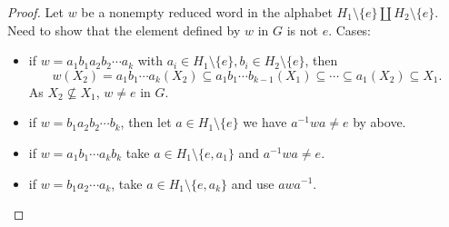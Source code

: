 \documentclass[a4paper]{article}
\begin{document}
\begin{proof}
  Let \(w\) be a nonempty reduced word in the alphabet \(H_1\setminus\{e\} \amalg H_2 \setminus \{e\}\). Need to show that the element defined by \(w\) in \(G\) is not \(e\). Cases:
  \begin{itemize}
  \item if \(w = a_1b_1 a_2b_2 \cdots a_k\) with \(a_i \in H_1 \setminus \{e\}, b_i \in H_2 \setminus \{e\}\), then
    \[
      w(X_2) = a_1b_1 \cdots a_k(X_2) \subseteq a_1b_1 \cdots b_{k - 1}(X_1)
      \subseteq \cdots \subseteq a_1(X_2) \subseteq X_1.
    \]
    As \(X_2 \nsubseteq X_1\), \(w \ne e\) in \(G\).
  \item if \(w = b_1a_2b_2 \cdots b_k\), then let \(a \in H_1 \setminus \{e\}\) we have \(a^{-1}wa \ne e\) by above.
  \item if \(w = a_1b_1 \cdots a_kb_k\) take \(a \in H_1 \setminus \{e, a_1\}\) and \(a^{-1}wa \ne e\).
  \item if \(w = b_1a_2 \cdots a_k\), take \(a \in H_1 \setminus \{e, a_k\}\) and use \(awa^{-1}\).
  \end{itemize}
\end{proof}
\end{document}
